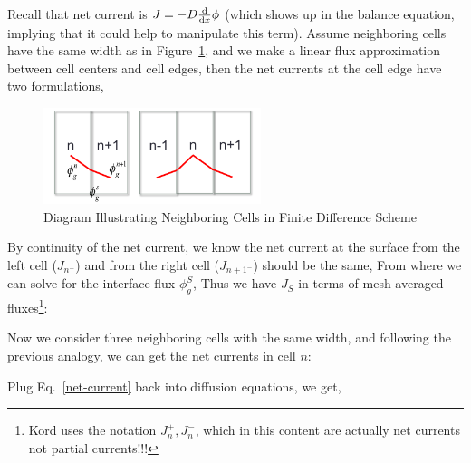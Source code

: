 \documentclass{school-22.211-notes}
\begin{document}
Recall that net current is $J = -D \frac{\mathrm{d}}{\mathrm{d}x} \phi$ (which shows up in the balance equation, implying that it could help to manipulate this term). Assume neighboring cells have the same width as in Figure~\ref{diagram-finite-difference}, and we make a linear flux approximation between cell centers and cell edges, then the net currents at the cell edge have two formulations, 
\begin{figure}[ht]
  \centering
  \includegraphics[width=2.5in]{images/dfs/diagram-finite-difference.png}
  \caption{Diagram Illustrating Neighboring Cells in Finite Difference Scheme} \label{diagram-finite-difference}
\end{figure}

By continuity of the net current, we know the net current at the surface from the left cell ($J_{n^+}$) and from the right cell ($J_{{n+1}^-}$) should be the same,
From where we can solve for the interface flux $\phi_g^S$, 
Thus we have $J_S$ in terms of mesh-averaged fluxes\footnote{Kord uses the notation $J_n^+, J_n^-$, which in this content are actually net currents not partial currents!!!}: 

Now we consider three neighboring cells with the same width, and following the previous analogy, we can get the net currents in cell $n$:


Plug Eq.~\ref{net-current} back into diffusion equations, we get, 
\end{document}
